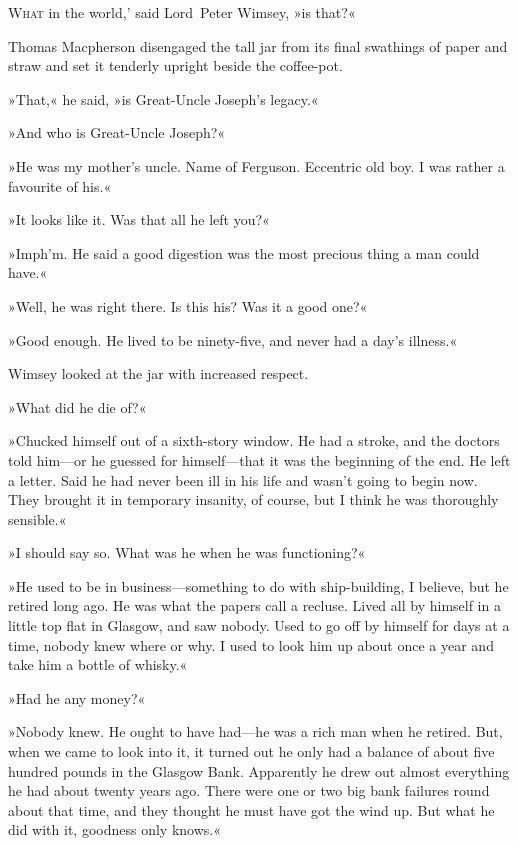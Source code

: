 
\lettrine[lines=4,ante=‘]{W}{hat} in the world,' said Lord~Peter Wimsey, »is that?«

\zz
Thomas Macpherson disengaged the tall jar from its final swathings of paper and straw and set it tenderly upright beside the coffee-pot.

»That,« he said, »is Great-Uncle Joseph's legacy.«

»And who is Great-Uncle Joseph?«

»He was my mother's uncle. Name of Ferguson. Eccentric old boy. I was rather a favourite of his.«

»It looks like it. Was that all he left you?«

»Imph'm. He said a good digestion was the most precious thing a man could have.«

»Well, he was right there. Is this his? Was it a good one?«

»Good enough. He lived to be ninety-five, and never had a day's illness.«

Wimsey looked at the jar with increased respect.

»What did he die of?«

»Chucked himself out of a sixth-story window. He had a stroke, and the doctors told him—or he guessed for himself—that it was the beginning of the end. He left a letter. Said he had never been ill in his life and wasn't going to begin now. They brought it in temporary insanity, of course, but I think he was thoroughly sensible.«

»I should say so. What was he when he was functioning?«

»He used to be in business—something to do with ship-building, I believe, but he retired long ago. He was what the papers call a recluse. Lived all by himself in a little top flat in Glasgow, and saw nobody. Used to go off by himself for days at a time, nobody knew where or why. I used to look him up about once a year and take him a bottle of whisky.«

»Had he any money?«

»Nobody knew. He ought to have had—he was a rich man when he retired. But, when we came to look into it, it turned out he only had a balance of about five hundred pounds in the Glasgow Bank. Apparently he drew out almost everything he had about twenty years ago. There were one or two big bank failures round about that time, and they thought he must have got the wind up. But what he did with it, goodness only knows.«

